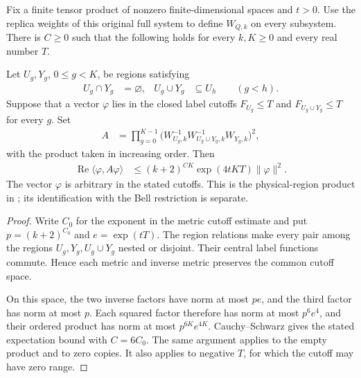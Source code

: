 \begin{theorem}
    \label{thm:replica_pinned_leaf_expectation}
    \leanok
    Fix a finite tensor product of nonzero finite-dimensional spaces and
    $t>0$. Use the replica weights of this original full system to define
    $W_{Q,k}$ on every subsystem. There is $C\ge0$ such that the following
    holds for every $k,K\ge0$ and every real number $T$.

    Let $U_g,Y_g$, $0\le g<K$, be regions satisfying
    \begin{align*}
        U_g\cap Y_g&=\varnothing, &
        U_g\cup Y_g&\subseteq U_h\qquad(g<h).
    \end{align*}
    Suppose that a vector $\varphi$ lies in the closed label cutoffs
    $F_{U_g}\le T$ and $F_{U_g\cup Y_g}\le T$ for every $g$.
    Set
    \begin{align*}
        A&=\prod_{g=0}^{K-1}
          \bigl(W_{U_g,k}^{-1}W_{U_g\cup Y_g,k}^{-1}W_{Y_g,k}\bigr)^2,
    \end{align*}
    with the product taken in increasing order. Then
    \begin{align*}
        \operatorname{Re}\langle\varphi,A\varphi\rangle
        &\le (k+2)^{CK}\exp(4tKT)\|\varphi\|^2.
    \end{align*}
    The vector $\varphi$ is arbitrary in the stated cutoffs. This is the physical-region
    product in \cite[\texttt{07-comparators.tex},
    \texttt{comparator:pinned-metric}, lines 356--373]{OpenAI2026AreaLaw};
    its identification with the Bell restriction is separate.
\end{theorem}
\begin{proof}
    \leanok
    Write $C_0$ for the exponent in the metric cutoff estimate and put
    $p=(k+2)^{C_0}$ and $e=\exp(tT)$. The region relations make every
    pair among the regions $U_g,Y_g,U_g\cup Y_g$ nested or disjoint.
    Their central label functions commute. Hence each metric and inverse
    metric preserves the common cutoff space.

    On this space, the two inverse factors have norm at most $pe$,
    and the third factor has norm at most $p$. Each squared factor
    therefore has norm at most $p^6e^4$, and their ordered product has
    norm at most $p^{6K}e^{4K}$. Cauchy--Schwarz gives the stated
    expectation bound with $C=6C_0$. The same argument applies to the
    empty product and to zero copies. It also applies to negative $T$,
    for which the cutoff may have zero range.
\end{proof}


